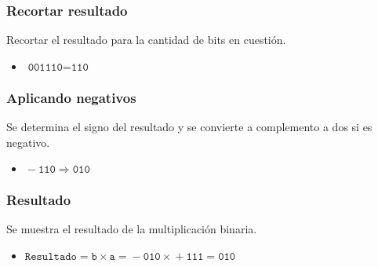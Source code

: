 \documentclass{beamer}
\begin{document}
\begin{frame}
\frametitle{Recortar resultado}
Recortar el resultado para la cantidad de bits en cuestión.
\begin{itemize}
\item $\texttt{001110}=\texttt{110}$
\end{itemize}
\end{frame}
\begin{frame}
\frametitle{Aplicando negativos}
Se determina el signo del resultado y se convierte a complemento a dos si es negativo.
\begin{itemize}
\item $\texttt{}-\texttt{110}\Longrightarrow\texttt{010}$
\end{itemize}
\end{frame}
\begin{frame}
\frametitle{Resultado}
Se muestra el resultado de la multiplicación binaria.
\begin{itemize}
\item $\texttt{Resultado}=\texttt{b}\times\texttt{a}=\texttt{}-\texttt{010}\times\texttt{}+\texttt{111}=\texttt{010}$
\end{itemize}
\end{frame}

\begin{frame}
\maketitle
{}
\end{frame}
\end{document}
